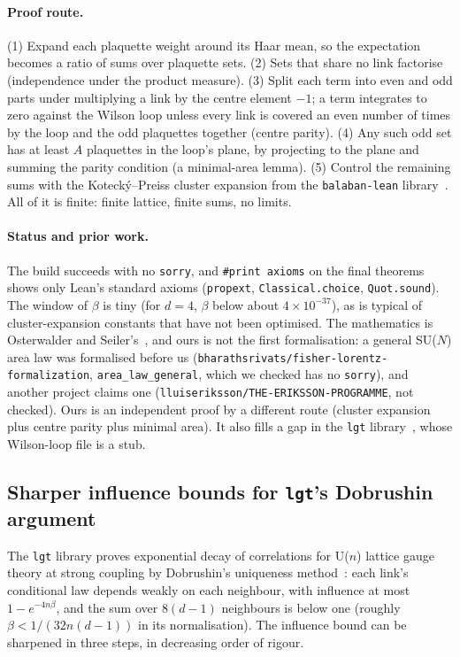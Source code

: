 \documentclass[11pt,a4paper]{article}
\newcommand{\lean}[1]{\texttt{#1}}
\begin{document}
\paragraph{Proof route.} (1) Expand each plaquette weight around its Haar mean, so the expectation becomes a ratio of sums over plaquette
sets. (2) Sets that share no link factorise (independence under the product measure). (3) Split each term into even and odd parts under
multiplying a link by the centre element $-1$; a term integrates to zero against the Wilson loop unless every link is covered an even number
of times by the loop and the odd plaquettes together (centre parity). (4) Any such odd set has at least $A$ plaquettes in the loop's plane,
by projecting to the plane and summing the parity condition (a minimal-area lemma). (5) Control the remaining sums with the Koteck\'y--Preiss
cluster expansion from the \texttt{balaban-lean} library~\cite{balabanlean}. All of it is finite: finite lattice, finite sums, no limits.

\paragraph{Status and prior work.} The build succeeds with no \lean{sorry}, and \lean{\#print axioms} on the final theorems shows only
Lean's standard axioms (\lean{propext}, \lean{Classical.choice}, \lean{Quot.sound}). The window of $\beta$ is tiny (for $d=4$, $\beta$ below
about $4\times10^{-37}$), as is typical of cluster-expansion constants that have not been optimised. The mathematics is Osterwalder and
Seiler's~\cite{os78}, and ours is not the first formalisation: a general SU($N$) area law was formalised before us
(\texttt{bharathsrivats/fisher-lorentz-formalization}, \lean{area\_law\_general}, which we checked has no \lean{sorry}), and another project
claims one (\texttt{lluiseriksson/THE-ERIKSSON-PROGRAMME}, not checked). Ours is an independent proof by a different route (cluster expansion
plus centre parity plus minimal area). It also fills a gap in the \texttt{lgt} library~\cite{lgt}, whose Wilson-loop file is a stub.

\subsection{Sharper influence bounds for \texttt{lgt}'s Dobrushin argument}

The \texttt{lgt} library proves exponential decay of correlations for U($n$) lattice gauge theory at strong coupling by Dobrushin's
uniqueness method~\cite{lgt}: each link's conditional law depends weakly on each neighbour, with influence at most $1-e^{-4n\beta}$, and the
sum over $8(d-1)$ neighbours is below one (roughly $\beta<1/(32n(d-1))$ in its normalisation). The influence bound can be sharpened in
three steps, in decreasing order of rigour.
\end{document}
